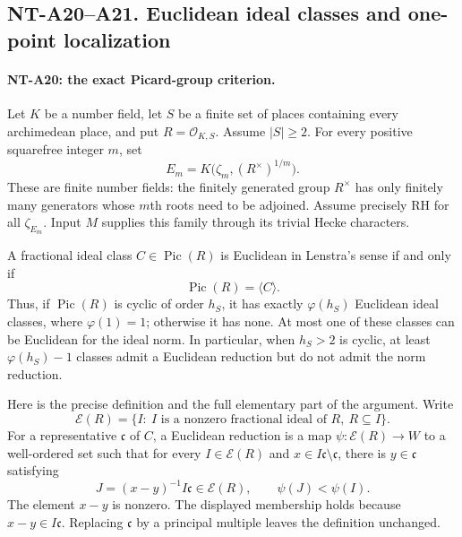 \subsection*{NT-A20--A21. Euclidean ideal classes and one-point localization}

\paragraph{NT-A20: the exact Picard-group criterion.}
Let $K$ be a number field, let $S$ be a finite set of places
containing every archimedean place, and put $R=\mathcal O_{K,S}$.
Assume $|S|\ge2$. For every positive squarefree integer $m$, set
\[
 E_m=K\bigl(\zeta_m,(R^\times)^{1/m}\bigr).
 \tag{A20.1}
\]
These are finite number fields: the finitely generated group
$R^\times$ has only finitely many generators whose $m$th roots
need to be adjoined. Assume precisely RH for all $\zeta_{E_m}$.
Input $M$ supplies this family through its trivial Hecke characters.

A fractional ideal class $C\in\operatorname{Pic}(R)$ is
Euclidean in Lenstra's sense if and only if
\[
                 \operatorname{Pic}(R)=\langle C\rangle.
 \tag{A20.2}
\]
Thus, if $\operatorname{Pic}(R)$ is cyclic of order $h_S$,
it has exactly $\varphi(h_S)$ Euclidean ideal classes,
where $\varphi(1)=1$; otherwise it has none.
At most one of these classes can be Euclidean for the ideal norm.
In particular, when $h_S>2$ is cyclic, at least
$\varphi(h_S)-1$ classes admit a Euclidean reduction but
do not admit the norm reduction.

Here is the precise definition and the full elementary part
of the argument. Write
\[
 \mathcal E(R)=\{I:\ I\text{ is a nonzero fractional ideal of }R,\
                                      R\subseteq I\}.
\]
For a representative $\mathfrak c$ of $C$, a Euclidean
reduction is a map $\psi:\mathcal E(R)\to W$ to a well-ordered
set such that for every $I\in\mathcal E(R)$ and
$x\in I\mathfrak c\setminus\mathfrak c$, there is
$y\in\mathfrak c$ satisfying
\[
 J=(x-y)^{-1}I\mathfrak c\in\mathcal E(R),
                    \qquad \psi(J)<\psi(I).
 \tag{A20.3}
\]
The element $x-y$ is nonzero. The displayed membership
holds because $x-y\in I\mathfrak c$.
Replacing $\mathfrak c$ by a principal multiple leaves
the definition unchanged.

